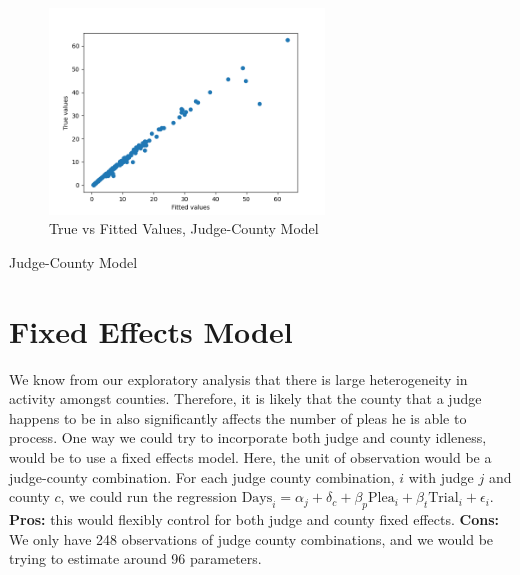 \documentclass[11pt]{article}
\begin{document}
    \begin{figure}[H]
      \centering
      \includegraphics[width=0.65\textwidth]{../../../output/figures/Exploration/fit_min_JudgeIDCounty}
      \caption{True vs Fitted Values, Judge-County Model}
    \end{figure}

    \begin{table}[H]
      \centering
      \caption{Judge-County Model}
      
    \end{table}

\section{Fixed Effects Model}
  We know from our exploratory analysis that there is large heterogeneity in activity amongst counties. Therefore, it is likely that the county that a judge happens to be in also significantly affects the number of pleas he is able to process. One way we could try to incorporate both judge and county idleness, would be to use
  a fixed effects model.  Here, the unit of observation would be a judge-county combination. For each judge county combination, $i$ with judge $j$ and county $c$, we could run the regression $\text{Days}_i = \alpha_j + \delta_c + \beta_p \text{Plea}_i + \beta_t \text{Trial}_i + \epsilon_i$. \textbf{Pros:} this would flexibly control for both judge and county fixed effects. \textbf{Cons:} We only have 248 observations of judge county combinations, and we would be trying to estimate around 96 parameters.
\end{document}
